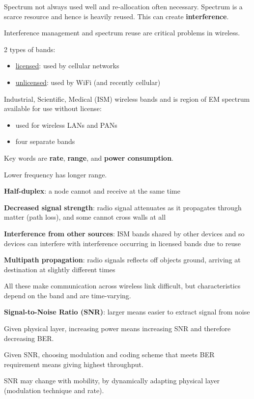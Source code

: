 \documentclass[11pt]{article}
\begin{document}
Spectrum not always used well and re-allocation often necessary.
Spectrum is a scarce resource and hence is heavily reused.
This can create \textbf{interference}.

Interference management and spectrum reuse are critical problems in wireless.

2 types of bands:
\begin{itemize}
\item \uline{licensed}: used by cellular networks
\item \uline{unlicensed}: used by WiFi (and recently cellular)
\end{itemize}

Industrial, Scientific, Medical (ISM) wireless bands and is region of EM spectrum available for use
without license:
\begin{itemize}
\item used for wireless LANs and PANs
\item four separate bands
\end{itemize}

Key words are \textbf{rate}, \textbf{range}, and \textbf{power consumption}.

Lower frequency has longer range.

\textbf{Half-duplex}: a node cannot and receive at the same time

\textbf{Decreased signal strength}: radio signal attenuates as it propagates through matter (path loss), and
some cannot cross walls at all

\textbf{Interference from other sources}: ISM bands shared by other devices and so devices can interfere with
interference occurring in licensed bands due to reuse

\textbf{Multipath propagation}: radio signals reflects off objects ground, arriving at destination at slightly
different times

All these make communication across wireless link difficult, but characteristics depend on the band and
are time-varying.

\textbf{Signal-to-Noise Ratio (SNR)}: larger means easier to extract signal from noise

Given physical layer, increasing power means increasing SNR and therefore decreasing BER.

Given SNR, choosing modulation and coding scheme that meets BER requirement means giving highest
throughput.

SNR may change with mobility, by dynamically adapting physical layer (modulation technique and rate).
\end{document}
